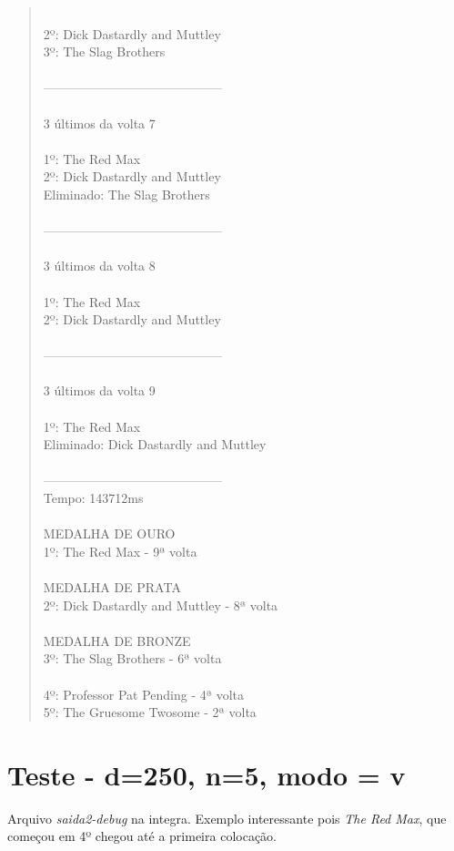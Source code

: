\documentclass[paper=a4, fontsize=11pt]{scrartcl}
\numberwithin{equation}{section}		%
\numberwithin{figure}{section}			%
\numberwithin{table}{section}				%
\begin{document}
\begin{quote}
\\2º: Dick Dastardly and Muttley
\\3º: The Slag Brothers
\\
\\------------------------------------------
\\
\\3 últimos da volta 7
\\
\\1º: The Red Max
\\2º: Dick Dastardly and Muttley
\\Eliminado: The Slag Brothers
\\
\\------------------------------------------
\\
\\3 últimos da volta 8
\\
\\1º: The Red Max
\\2º: Dick Dastardly and Muttley
\\
\\------------------------------------------
\\
\\3 últimos da volta 9
\\
\\1º: The Red Max
\\Eliminado: Dick Dastardly and Muttley
\\
\\------------------------------------------
\\Tempo: 143712ms
\\
\\MEDALHA DE OURO
\\1º: The Red Max - 9ª volta
\\
\\MEDALHA DE PRATA
\\2º: Dick Dastardly and Muttley - 8ª volta
\\
\\MEDALHA DE BRONZE
\\3º: The Slag Brothers - 6ª volta
\\
\\4º: Professor Pat Pending - 4ª volta
\\5º: The Gruesome Twosome - 2ª volta
\\
\end{quote}

\section{Teste  - d=250, n=5, modo = v}
Arquivo \textit{saida2-debug} na integra. Exemplo interessante pois \textit{The Red Max}, que começou em 4º chegou até a primeira colocação.
\end{document}
